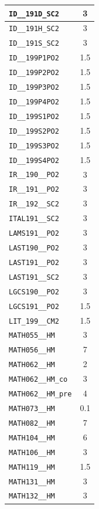 \begin{longtable}{|p{}|c|}
    \verb|ID__191D_SC2| & 3\\\hline
    \verb|ID__191H_SC2| & 3\\\hline
    \verb|ID__191S_SC2| & 3\\\hline
    \verb|ID__199P1PO2| & 1.5\\\hline
    \verb|ID__199P2PO2| & 1.5\\\hline
    \verb|ID__199P3PO2| & 1.5\\\hline
    \verb|ID__199P4PO2| & 1.5\\\hline
    \verb|ID__199S1PO2| & 1.5\\\hline
    \verb|ID__199S2PO2| & 1.5\\\hline
    \verb|ID__199S3PO2| & 1.5\\\hline
    \verb|ID__199S4PO2| & 1.5\\\hline
    \verb|IR__190__PO2| & 3\\\hline
    \verb|IR__191__PO2| & 3\\\hline
    \verb|IR__192__SC2| & 3\\\hline
    \verb|ITAL191__SC2| & 3\\\hline
    \verb|LAMS191__PO2| & 3\\\hline
    \verb|LAST190__PO2| & 3\\\hline
    \verb|LAST191__PO2| & 3\\\hline
    \verb|LAST191__SC2| & 3\\\hline
    \verb|LGCS190__PO2| & 3\\\hline
    \verb|LGCS191__PO2| & 1.5\\\hline
    \verb|LIT_199__CM2| & 1.5\\\hline
    \verb|MATH055__HM| & 3\\\hline
    \verb|MATH056__HM| & 7\\\hline
    \verb|MATH062__HM| & 2\\\hline
    \verb|MATH062__HM_co| & 3\\\hline
    \verb|MATH062__HM_pre| & 4\\\hline
    \verb|MATH073__HM| & 0.1\\\hline
    \verb|MATH082__HM| & 7\\\hline
    \verb|MATH104__HM| & 6\\\hline
    \verb|MATH106__HM| & 3\\\hline
    \verb|MATH119__HM| & 1.5\\\hline
    \verb|MATH131__HM| & 3\\\hline
    \verb|MATH132__HM| & 3\\\hline

\end{longtable}
